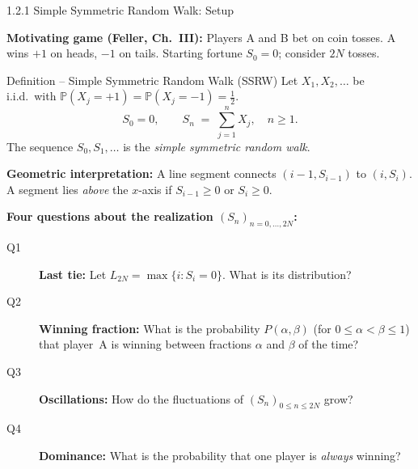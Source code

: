 \documentclass[aspectratio=169,10pt]{beamer}
\begin{document}
\begin{frame}[allowframebreaks]{1.2.1 Simple Symmetric Random Walk: Setup}

  \textbf{Motivating game (Feller, Ch.~III):}
  Players A and B bet on coin tosses. A wins $+1$ on heads, $-1$ on tails.
  Starting fortune $S_0 = 0$; consider $2N$ tosses.

  \begin{block}{Definition -- Simple Symmetric Random Walk (SSRW)}
    Let $X_1, X_2, \ldots$ be i.i.d.\ with
    $\mathbb{P}(X_j = +1) = \mathbb{P}(X_j = -1) = \tfrac{1}{2}$.
    \[
      S_0 = 0, \qquad S_n \;=\; \sum_{j=1}^{n} X_j, \quad n \ge 1.
    \]
    The sequence $S_0, S_1, \ldots$ is the \emph{simple symmetric random walk}.
  \end{block}

  \textbf{Geometric interpretation:} A line segment connects
  $(i-1, S_{i-1})$ to $(i, S_i)$. A segment lies \emph{above} the
  $x$-axis if $S_{i-1} \ge 0$ or $S_i \ge 0$.

  \framebreak

  \textbf{Four questions about the realization $(S_n)_{n=0,\ldots,2N}$:}

  \begin{description}
    \item[Q1] \textbf{Last tie:} Let
      $L_{2N} = \max\{i : S_i = 0\}$. What is its distribution?
    \item[Q2] \textbf{Winning fraction:} What is the probability
      $P(\alpha,\beta)$ (for $0 \le \alpha < \beta \le 1$) that
      player~A is winning between fractions $\alpha$ and $\beta$ of the time?
    \item[Q3] \textbf{Oscillations:} How do the fluctuations of
      $(S_n)_{0\le n\le 2N}$ grow?
    \item[Q4] \textbf{Dominance:} What is the probability that one
      player is \emph{always} winning?
  \end{description}

\end{frame}
\end{document}
